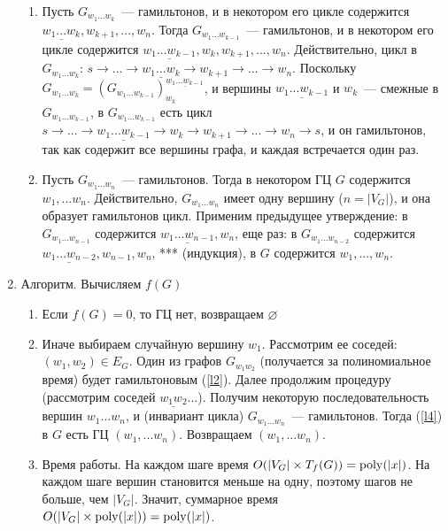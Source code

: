 \documentclass[a4paper]{article}
\def\poly{{\rm{poly}}}
\begin{document}
\begin{enumerate}
\begin{enumerate}
\item Пусть $G_{w_1...w_k}$~--- гамильтонов, и в некотором его цикле содержится $\underline{w_1...w_k},w_{k+1},...,w_n$. Тогда $G_{w_1...w_{k-1}}$~--- гамильтонов, и в некотором его цикле содержится $\underline{w_1...w_{k-1}},w_k,w_{k+1},...,w_n$. Действительно, цикл в $G_{w_1...w_k}$: $s\to...\to \underline{w_1...w_k}\to w_{k+1}\to...\to w_n$. Поскольку $G_{w_1...w_k}=(G_{w_1...w_{k-1}})^{\underline{w_1...w_{k-1}}}_{w_k}$, и вершины $\underline{w_1...w_{k-1}}$ и $w_k$~--- смежные в $G_{w_1...w_{k-1}}$, в $G_{w_1...w_{k-1}}$ есть цикл $s\to...\to \underline{w_1...w_{k-1}}\to w_k\to w_{k+1}\to...\to w_n\to s$, и он гамильтонов, так как содержит все вершины графа, и каждая встречается один раз.
\item \label{l4} Пусть $G_{w_1...w_n}$~--- гамильтонов. Тогда в некотором ГЦ $G$ содержится $w_1,...w_n$. Действительно, $G_{w_1...w_n}$ имеет одну вершину ($n=|V_G|$), и она образует гамильтонов цикл. Применим предыдущее утверждение: в $G_{w_1...w_{n-1}}$ содержится $\underline{w_1...w_{n-1}},w_n$, еще раз: в $G_{w_1...w_{n-2}}$ содержится $\underline{w_1...w_{n-2}},w_{n-1},w_n$, *** (индукция), в $G$ содержится $w_1,...,w_n$.
\end{enumerate}
\item Алгоритм. Вычисляем $f(G)$\begin{enumerate}
\item Если $f(G)=0$, то ГЦ нет, возвращаем $\varnothing$
\item Иначе выбираем случайную вершину $w_1$. Рассмотрим ее соседей: $(w_1,w_2)\in E_G$. Один из графов $G_{w_1w_2}$ (получается за полиномиальное время) будет гамильтоновым (\ref{l2}). Далее продолжим процедуру (рассмотрим соседей $\underline{w_1w_2}$...). Получим некоторую последовательность вершин $w_1...w_n$, и (инвариант цикла) $G_{w_1...w_n}$~--- гамильтонов. Тогда (\ref{l4}) в $G$ есть ГЦ $(w_1,...w_n)$. Возвращаем $(w_1,...w_n)$.
\item Время работы. На каждом шаге время $O(|V_G|\times T_f(G))=\poly(|x|)$. На каждом шаге вершин становится меньше на одну, поэтому шагов не больше, чем $|V_G|$. Значит, суммарное время $O(|V_G|\times\poly(|x|))=\poly(|x|)$.
\end{enumerate}
\end{enumerate}
\end{document}
